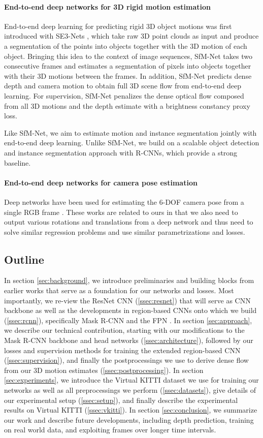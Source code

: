 \paragraph{End-to-end deep networks for 3D rigid motion estimation}
End-to-end deep learning for predicting rigid 3D object motions was first introduced with
SE3-Nets \cite{SE3Nets}, which take raw 3D point clouds as input and produce a segmentation
of the points into objects together with the 3D motion of each object.
Bringing this idea to the context of image sequences, SfM-Net \cite{SfmNet} takes two consecutive frames and
estimates a segmentation of pixels into objects together with their 3D motions between the frames.
In addition, SfM-Net predicts dense depth and camera motion to obtain full 3D scene flow from end-to-end deep learning.
For supervision, SfM-Net penalizes the dense optical flow composed from all 3D motions and the depth estimate
with a brightness constancy proxy loss.

Like SfM-Net, we aim to estimate motion and instance segmentation jointly with
end-to-end deep learning.
Unlike SfM-Net, we build on a scalable object detection and instance segmentation
approach with R-CNNs, which provide a strong baseline.

\paragraph{End-to-end deep networks for camera pose estimation}
Deep networks have been used for estimating the 6-DOF camera pose from
a single RGB frame \cite{PoseNet, PoseNet2}. These works are related to
ours in that we also need to output various rotations and translations from a deep network
and thus need to solve similar regression problems and use similar parametrizations
and losses.


\subsection{Outline}
In section \ref{sec:background}, we introduce preliminaries and building
blocks from earlier works that serve as a foundation for our networks and losses.
Most importantly, we re-view the ResNet CNN (\ref{ssec:resnet}) that will serve as CNN backbone
as well as the developments in region-based CNNs onto which we build (\ref{ssec:rcnn}),
specifically Mask R-CNN and the FPN \cite{FPN}.
In section \ref{sec:approach}, we describe our technical contribution, starting
with our modifications to the Mask R-CNN backbone and head networks (\ref{ssec:architecture}),
followed by our losses and supervision methods for training
the extended region-based CNN (\ref{ssec:supervision}), and
finally the postprocessings we use to derive dense flow from our 3D motion estimates
(\ref{ssec:postprocessing}).
In section \ref{sec:experiments}, we introduce the Virtual KITTI dataset we use
for training our networks as well as all preprocessings we perform (\ref{ssec:datasets}),
give details of our experimental setup (\ref{ssec:setup}),
and finally describe the experimental results
on Virtual KITTI (\ref{ssec:vkitti}).
In section \ref{sec:conclusion}, we summarize our work and describe future
developments, including depth prediction, training on real world data,
and exploiting frames over longer time intervals.
